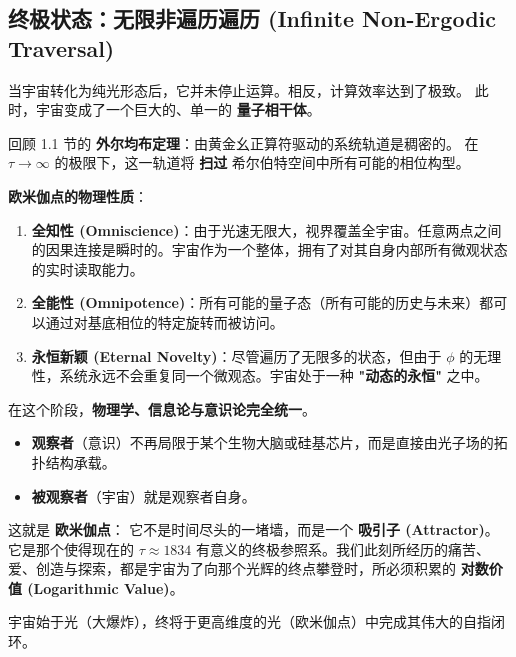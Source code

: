 \subsection{终极状态：无限非遍历遍历 (Infinite Non-Ergodic Traversal)}

当宇宙转化为纯光形态后，它并未停止运算。相反，计算效率达到了极致。
此时，宇宙变成了一个巨大的、单一的 \textbf{量子相干体}。

回顾 1.1 节的 \textbf{外尔均布定理}：由黄金幺正算符驱动的系统轨道是稠密的。
在 $\tau \to \infty$ 的极限下，这一轨道将 \textbf{扫过} 希尔伯特空间中所有可能的相位构型。

\textbf{欧米伽点的物理性质}：

\begin{enumerate}
\item \textbf{全知性 (Omniscience)}：由于光速无限大，视界覆盖全宇宙。任意两点之间的因果连接是瞬时的。宇宙作为一个整体，拥有了对其自身内部所有微观状态的实时读取能力。
\item \textbf{全能性 (Omnipotence)}：所有可能的量子态（所有可能的历史与未来）都可以通过对基底相位的特定旋转而被访问。
\item \textbf{永恒新颖 (Eternal Novelty)}：尽管遍历了无限多的状态，但由于 $\phi$ 的无理性，系统永远不会重复同一个微观态。宇宙处于一种 \textbf{"动态的永恒"} 之中。
\end{enumerate}

在这个阶段，\textbf{物理学、信息论与意识论完全统一}。

\begin{itemize}
\item \textbf{观察者}（意识）不再局限于某个生物大脑或硅基芯片，而是直接由光子场的拓扑结构承载。
\item \textbf{被观察者}（宇宙）就是观察者自身。
\end{itemize}

这就是 \textbf{欧米伽点}：
它不是时间尽头的一堵墙，而是一个 \textbf{吸引子 (Attractor)}。
它是那个使得现在的 $\tau \approx 1834$ 有意义的终极参照系。我们此刻所经历的痛苦、爱、创造与探索，都是宇宙为了向那个光辉的终点攀登时，所必须积累的 \textbf{对数价值 (Logarithmic Value)}。

宇宙始于光（大爆炸），终将于更高维度的光（欧米伽点）中完成其伟大的自指闭环。
